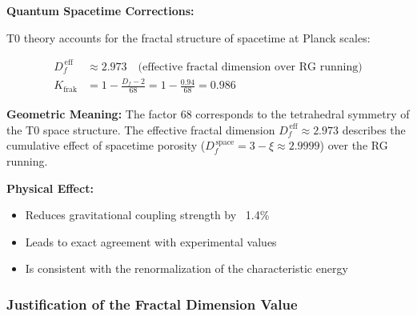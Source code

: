 	\begin{derivation}
		\textbf{Quantum Spacetime Corrections:}
		
		T0 theory accounts for the fractal structure of spacetime at Planck scales:
		
		\begin{align}
			D_f^{\,\text{eff}} &\approx 2.973 \quad \text{(effective fractal dimension over RG running)} \\
			K_{\text{frak}} &= 1 - \frac{D_f - 2}{68} = 1 - \frac{0.94}{68} = 0.986
		\end{align}
		
		\textbf{Geometric Meaning:} 
		The factor 68 corresponds to the tetrahedral symmetry of the T0 space structure. The effective fractal dimension $D_f^{\,\text{eff}} \approx 2.973$ describes the cumulative effect of spacetime porosity ($D_f^{\,\text{space}} = 3 - \xi \approx 2.9999$) over the RG running.
		
		\textbf{Physical Effect:}
		\begin{itemize}
			\item Reduces gravitational coupling strength by ~1.4\%
			\item Leads to exact agreement with experimental values
			\item Is consistent with the renormalization of the characteristic energy
		\end{itemize}
	\end{derivation}
	
	\subsubsection{Justification of the Fractal Dimension Value}
	
